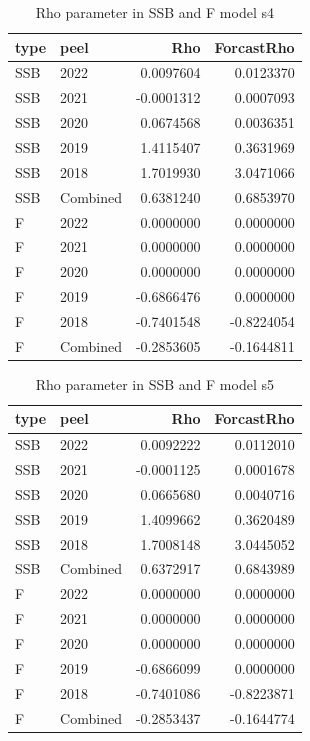 \documentclass[
]{article}
\begin{document}
\begin{table}[H]

\caption{\label{tab:unnamed-chunk-14}\label{mod4}Rho parameter in SSB  and F model s4}
\centering
\begin{tabular}[t]{llrr}
\toprule
type & peel & Rho & ForcastRho\\
\midrule
SSB & 2022 & 0.0097604 & 0.0123370\\
SSB & 2021 & -0.0001312 & 0.0007093\\
SSB & 2020 & 0.0674568 & 0.0036351\\
SSB & 2019 & 1.4115407 & 0.3631969\\
SSB & 2018 & 1.7019930 & 3.0471066\\
\addlinespace
SSB & Combined & 0.6381240 & 0.6853970\\
F & 2022 & 0.0000000 & 0.0000000\\
F & 2021 & 0.0000000 & 0.0000000\\
F & 2020 & 0.0000000 & 0.0000000\\
F & 2019 & -0.6866476 & 0.0000000\\
\addlinespace
F & 2018 & -0.7401548 & -0.8224054\\
F & Combined & -0.2853605 & -0.1644811\\
\bottomrule
\end{tabular}
\end{table}

\begin{table}[H]

\caption{\label{tab:unnamed-chunk-14}\label{mod5}Rho parameter in SSB  and F model s5}
\centering
\begin{tabular}[t]{llrr}
\toprule
type & peel & Rho & ForcastRho\\
\midrule
SSB & 2022 & 0.0092222 & 0.0112010\\
SSB & 2021 & -0.0001125 & 0.0001678\\
SSB & 2020 & 0.0665680 & 0.0040716\\
SSB & 2019 & 1.4099662 & 0.3620489\\
SSB & 2018 & 1.7008148 & 3.0445052\\
\addlinespace
SSB & Combined & 0.6372917 & 0.6843989\\
F & 2022 & 0.0000000 & 0.0000000\\
F & 2021 & 0.0000000 & 0.0000000\\
F & 2020 & 0.0000000 & 0.0000000\\
F & 2019 & -0.6866099 & 0.0000000\\
\addlinespace
F & 2018 & -0.7401086 & -0.8223871\\
F & Combined & -0.2853437 & -0.1644774\\
\bottomrule
\end{tabular}
\end{table}
\end{document}
